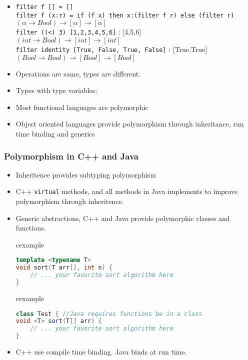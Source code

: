 \begin{frame}
 \begin{itemize}
  \item \texttt{\scriptsize filter f [] = []  \\
filter f (x:r) = if (f x) then x:(filter f r) else (filter r)}\\
 $(\alpha \rightarrow Bool) \rightarrow [\alpha] \rightarrow [\alpha]$\\
 \texttt{filter ((<) 3) [1,2,3,4,5,6]} : [4,5,6] \\
$(int \rightarrow Bool) \rightarrow [int] \rightarrow [int]$ \\
 \texttt{filter identity [True, False, True, False]} : [True,True] \\
 $(Bool \rightarrow Bool) \rightarrow [Bool] \rightarrow [Bool]$
\item Operations are same, types are different.
\item Types with type variables: 
\item Most functional languages are polymorphic
\item Object oriented languages provide polymorphism through inheritance,
    run time binding and generics
\end{itemize}
\end{frame}

\begin{frame}[fragile]
\frametitle{Polymorphism in C++ and Java}
\begin{itemize}
\item Inheritence provides subtyping polymorphism
\item C++ \lstinline!virtual! methods, and all methods in Java implements 
   to improve polymorphism  through inheritence.
\item Generic abstractions, C++  and Java  provide 
polymorphic classes and functions.
\begin{beamercolorbox}{cexample}
\begin{lstlisting}[language=C++]
template <typename T>
void sort(T arr[], int n) {
    // ... your favorite sort algorithm here
}
\end{lstlisting}
\end{beamercolorbox}
\begin{beamercolorbox}{cexample}
\begin{lstlisting}[language=Java]
class Test { //Java requires functions be in a class
void <T> sort(T[] arr) {
    // ... your favorite sort algorithm here
}
\end{lstlisting}
\end{beamercolorbox}
\item C++  use compile time binding. Java  binds at run time.
\end{itemize}
\end{frame}

